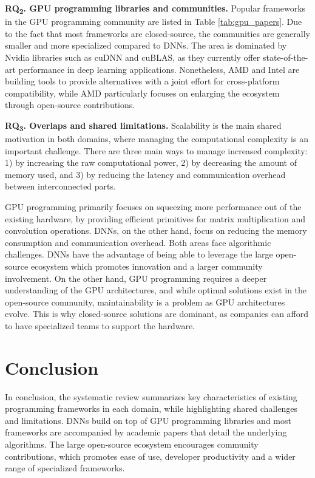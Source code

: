 \textbf{RQ\textsubscript{2}. GPU programming libraries and communities.}
Popular frameworks in the GPU programming community are listed in Table \ref{tab:gpu_papers}. Due
to the fact that most frameworks are closed-source, the communities are generally smaller and more
specialized compared to DNNs. The area is dominated by Nvidia libraries such as cuDNN and cuBLAS,
as they currently offer state-of-the-art performance in deep learning applications. Nonetheless,
AMD and Intel are building tools to provide alternatives with a joint effort for cross-platform
compatibility, while AMD particularly focuses on enlarging the ecosystem through open-source
contributions.

\textbf{RQ\textsubscript{3}. Overlaps and shared limitations.}
Scalability is the main shared motivation in both domains, where managing the computational
complexity is an important challenge. There are three main ways to manage increased complexity: 1)
by increasing the raw computational power, 2) by decreasing the amount of memory used, and 3) by
reducing the latency and communication overhead between interconnected parts.

GPU programming primarily focuses on squeezing more performance out of the existing hardware, by
providing efficient primitives for matrix multiplication and convolution operations. DNNs, on the
other hand, focus on reducing the memory consumption and communication overhead. Both areas face
algorithmic challenges. DNNs have the advantage of being able to leverage the large open-source
ecosystem which promotes innovation and a larger community involvement. On the other hand, GPU
programming requires a deeper understanding of the GPU architectures, and while optimal solutions
exist in the open-source community, maintainability is a problem as GPU architectures evolve. This
is why closed-source solutions are dominant, as companies can afford to have specialized teams to
support the hardware.

\section{Conclusion}
\label{sec:conclusion}
In conclusion, the systematic review summarizes key characteristics of existing programming frameworks
in each domain, while highlighting shared challenges and limitations. DNNs build on top of GPU programming
libraries and most frameworks are accompanied by academic papers that detail the underlying algorithms.
The large open-source ecosystem encourages community contributions, which promotes ease of use,
developer productivity and a wider range of specialized frameworks.

